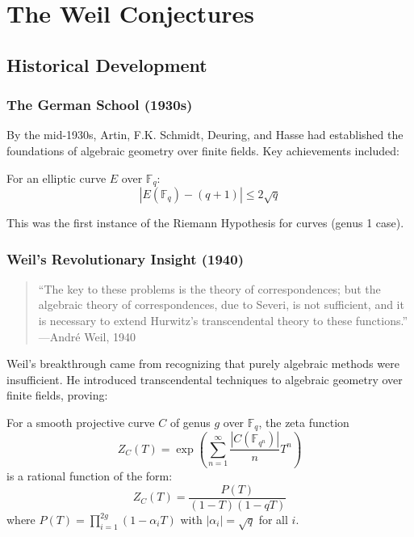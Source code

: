 \section{The Weil Conjectures}
\label{sec:weil_conjectures}

\subsection{Historical Development}

\subsubsection{The German School (1930s)}

By the mid-1930s, Artin, F.K. Schmidt, Deuring, and Hasse had established the foundations of algebraic geometry over finite fields. Key achievements included:

\begin{theorem}
For an elliptic curve $E$ over $\mathbb{F}_q$:
\begin{equation}
|E(\mathbb{F}_q) - (q+1)| \leq 2\sqrt{q}
\end{equation}
\end{theorem}

This was the first instance of the Riemann Hypothesis for curves (genus 1 case).

\subsubsection{Weil's Revolutionary Insight (1940)}

\begin{quote}
``The key to these problems is the theory of correspondences; but the algebraic theory of correspondences, due to Severi, is not sufficient, and it is necessary to extend Hurwitz's transcendental theory to these functions.'' —André Weil, 1940 \cite{weil1948}
\end{quote}

Weil's breakthrough came from recognizing that purely algebraic methods were insufficient. He introduced transcendental techniques to algebraic geometry over finite fields, proving:

\begin{theorem}
\label{thm:weil_curves}
For a smooth projective curve $C$ of genus $g$ over $\mathbb{F}_q$, the zeta function
\begin{equation}
Z_C(T) = \exp\left(\sum_{n=1}^{\infty} \frac{|C(\mathbb{F}_{q^n})|}{n} T^n\right)
\end{equation}
is a rational function of the form:
\begin{equation}
Z_C(T) = \frac{P(T)}{(1-T)(1-qT)}
\end{equation}
where $P(T) = \prod_{i=1}^{2g}(1-\alpha_i T)$ with $|\alpha_i| = \sqrt{q}$ for all $i$.
\end{theorem}

